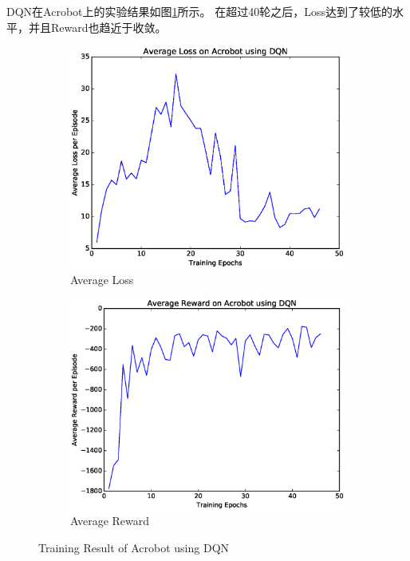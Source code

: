 \documentclass[a4paper,UTF8]{article}
\theoremstyle{definition}
\begin{document}
DQN在Acrobot上的实验结果如图\ref{fig:bot-dqn}所示。
在超过40轮之后，Loss达到了较低的水平，并且Reward也趋近于收敛。

\begin{figure}[H]
	\centering
	\begin{subfigure}[t]{0.5\textwidth}
		\centering
		\includegraphics[scale=0.35]{figures/bot-dqn-loss}
		\caption{Average Loss}
	\end{subfigure}%
	\begin{subfigure}[t]{0.5\textwidth}
		\centering
		\includegraphics[scale=0.35]{figures/bot-dqn-reward}
		\caption{Average Reward}
	\end{subfigure}
	\caption{Training Result of Acrobot using DQN}\label{fig:bot-dqn}
\end{figure}
\end{document}
